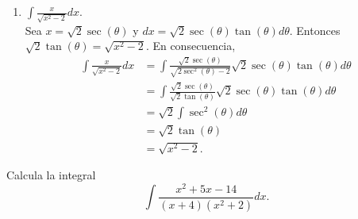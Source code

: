 \documentclass[12pt,a4paper]{article}
\begin{document}
\begin{solucion}
\begin{enumerate}
\begin{align*}
                &=\int\frac{3\tan(\theta)}{3\sec(\theta)}3\sec^{2}(\theta)d\theta\\
                &=3\int\tan(\theta)\sec(\theta)d\theta
            \end{align*}
            Ahora, hagamos $u=\sec(\theta)$ y $du=\sec(\theta)\tan(\theta)d\theta$. Por lo tanto
            \begin{align*}
                3\int\tan(\theta)\sec(\theta)d\theta&=\int du\\
                &=3u\\
                &=3\sec(\theta)\\
                &=\sqrt{x^{2}+9}.
            \end{align*}
            Así,
            \begin{equation*}
                \int\frac{x}{\sqrt{x^{2}+9}}dx=\sqrt{x^{2}+9}.
            \end{equation*}
            \item[(e)] $\displaystyle\int\frac{x}{\sqrt{x^{2}-2}}dx$.\\
            Sea $x=\sqrt{2}\sec(\theta)$ y $dx=\sqrt{2}\sec(\theta)\tan(\theta)d\theta$. Entonces $\sqrt{2}\tan(\theta)=\sqrt{x^{2}-2}$. En consecuencia,
            \begin{align*}
                \int\frac{x}{\sqrt{x^{2}-2}}dx&=\int\frac{\sqrt{2}\sec(\theta)}{\sqrt{2\sec^{2}(\theta)-2}}\sqrt{2}\sec(\theta)\tan(\theta)d\theta\\
                &=\int\frac{\sqrt{2}\sec(\theta)}{\sqrt{2}\tan(\theta)}\sqrt{2}\sec(\theta)\tan(\theta)d\theta\\
                &=\sqrt{2}\int\sec^{2}(\theta)d\theta\\
                &=\sqrt{2}\tan(\theta)\\
                &=\sqrt{x^{2}-2}.
            \end{align*}
        \end{enumerate}
    \end{solucion}

    \begin{mdframed}[style=mdbluebox,frametitle={Ejercicio 3}]
        Calcula la integral
        \begin{equation*}
            \int\frac{x^{2}+5x-14}{(x+4)(x^{2}+2)}dx.
        \end{equation*}
    \end{mdframed}
\end{document}
